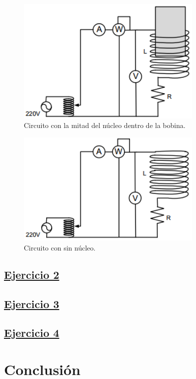 \documentclass[a4paper]{article}
\begin{document}
\begin{figure}[H]
	\centering
	\includegraphics[width=0.8\textwidth]{Circuito-ejercicio-1B}
	\caption{Circuito con la mitad del núcleo dentro de la bobina.}
	\label{fig:1b}
\end{figure}

\begin{figure}[H]
	\centering
	\includegraphics[width=0.8\textwidth]{Circuito-ejercicio-1C}
	\caption{Circuito con sin núcleo.}
	\label{fig:1c}
\end{figure}

\newpage

\subsection*{\underline{Ejercicio 2}}

\newpage

\subsection*{\underline{Ejercicio 3}}

\newpage

\subsection*{\underline{Ejercicio 4}}

\section*{Conclusión}
\end{document}
